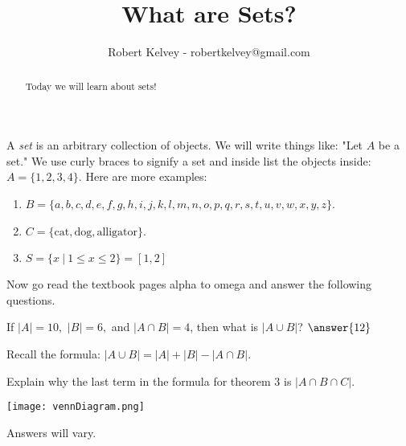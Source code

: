\documentclass{ximera}
\title{What are Sets?}
\author{Robert Kelvey - robertkelvey@gmail.com}
\begin{document}
\begin{abstract}
Today we will learn about sets!
\end{abstract}

\maketitle

A \emph{set} is an arbitrary collection of objects. We will write things like: "Let $A$ be a set." We use curly braces to signify a set and inside list the objects inside: $A = \{1,2,3,4\}$.
Here are more examples:

\begin{example}
    \begin{enumerate}
        \item $B=\{a,b,c,d,e,f,g,h,i,j,k,l,m,n,o,p,q,r,s,t,u,v,w,x,y,z\}$.
        \item $C=\{\text{cat}, \text{dog}, \text{alligator}\}$.
        \item $S=\{x ~|~ 1 \leq x \leq 2\} = [1,2]$
    \end{enumerate}
\end{example}

Now go read the textbook pages alpha to omega and answer the following questions.

\begin{question}
If $|A|=10,$ $|B|=6,$ and $|A \cap B| = 4$, then what is $|A \cup B|$? $\answer{12} $

\begin{hint}
Recall the formula: $|A \cup B| = |A| + |B| - |A \cap B|$.
\end{hint}

\end{question}

\begin{question}
Explain why the last term in the formula for theorem 3 is $|A \cap B \cap C|$.
    \begin{hint}
        \begin{image}
            \texttt{[image: vennDiagram.png]}
        \end{image}
    \end{hint}
    \begin{freeResponse}
        Answers will vary.
    \end{freeResponse}

\end{question}
%
\end{document}
